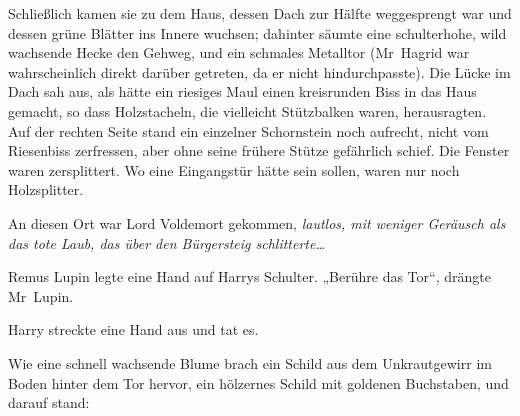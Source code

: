 Schließlich kamen sie zu dem Haus, dessen Dach zur Hälfte weggesprengt war und dessen grüne Blätter ins Innere wuchsen; dahinter säumte eine schulterhohe, wild wachsende Hecke den Gehweg, und ein schmales Metalltor (Mr~Hagrid war wahrscheinlich direkt darüber getreten, da er nicht hindurchpasste).
Die Lücke im Dach sah aus, als hätte ein riesiges Maul einen kreisrunden Biss in das Haus gemacht, so dass Holzstacheln, die vielleicht Stützbalken waren, herausragten. Auf der rechten Seite stand ein einzelner Schornstein noch aufrecht, nicht vom Riesenbiss zerfressen, aber ohne seine frühere Stütze gefährlich schief. Die Fenster waren zersplittert. Wo eine Eingangstür hätte sein sollen, waren nur noch Holzsplitter.

An diesen Ort war Lord Voldemort gekommen, \emph{lautlos, mit weniger Geräusch als das tote Laub, das über den Bürgersteig schlitterte…}

Remus Lupin legte eine Hand auf Harrys Schulter. „Berühre das Tor“, drängte Mr~Lupin.

Harry streckte eine Hand aus und tat es.

Wie eine schnell wachsende Blume brach ein Schild aus dem Unkrautgewirr im Boden hinter dem Tor hervor, ein hölzernes Schild mit goldenen Buchstaben, und darauf stand:


